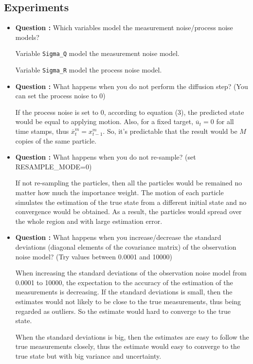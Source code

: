 \documentclass[11pt,a4paper]{article}
\begin{document}
\subsection{Experiments}
\begin{itemize}
	\item\addtocounter{Counter}{1}\textbf{Question :} Which variables model the measurement noise/process noise models?
		\par Variable \texttt{Sigma\_Q} model the measurement noise model.
		\par Variable \texttt{Sigma\_R} model the process noise model.

	\item\addtocounter{Counter}{1}\textbf{Question :} What happens when you do not perform the diffusion step? (You can set the process noise to 0)
		\par If the process noise is set to $0$, according to equation (3), the predicted state would be equal to applying motion. Also, for a fixed target, $\overline{u}_{t} = 0$ for all time stamps, thus $\overline{x}^{m}_{t} = x_{t-1}^{m}$. So, it's predictable that the result would be $M$ copies of the same particle.

	\item\addtocounter{Counter}{1}\textbf{Question :} What happens when you do not re-sample? (set RESAMPLE\_MODE=0)
		\par If not re-sampling the particles, then all the particles would be remained no matter how much the importance weight. The motion of each particle simulates the estimation of the true state from a different initial state and no convergence would be obtained. As a result, the particles would spread over the whole region and with large estimation error.

	\item\addtocounter{Counter}{1}\textbf{Question :} What happens when you increase/decrease the standard deviations (diagonal elements of the covariance matrix) of the observation noise model? (Try values between 0.0001 and 10000)
		\par When increasing the standard deviations of the observation noise model from 0.0001 to 10000, the expectation to the accuracy of the estimation of the measurements is decreasing. If the standard deviations is small, then the estimates would not likely to be close to the true measurements, thus being regarded as outliers. So the estimate would hard to converge to the true state.
		\par When the standard deviations is big, then the estimates are easy to follow the true measurements closely, thus the estimate would easy to converge to the true state but with big variance and uncertainty.


\end{itemize}
\end{document}
